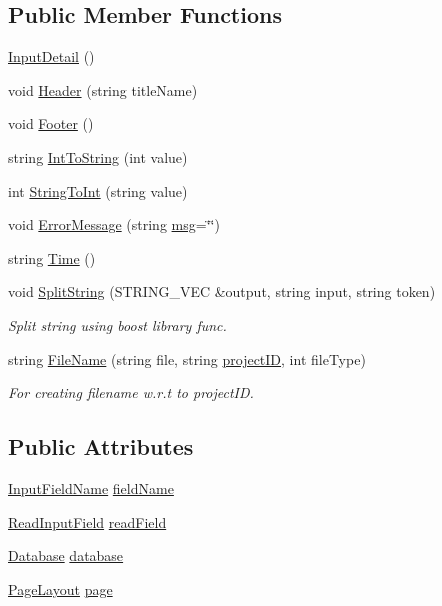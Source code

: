 \subsection*{Public Member Functions}
\begin{DoxyCompactItemize}
\item 
\hyperlink{classInputDetail_ab53655b14d922eb32b5d5d06c702e497}{Input\-Detail} ()
\item 
void \hyperlink{classInputDetail_ae55dcc0e15b85d302a09046b145330bb}{Header} (string title\-Name)
\item 
void \hyperlink{classInputDetail_acbc05b1bc6a371cf0a52222cc95e467d}{Footer} ()
\item 
string \hyperlink{classInputDetail_ad0a78d7c864bcccf7813a526d59573be}{Int\-To\-String} (int value)
\item 
int \hyperlink{classInputDetail_aaf532dd61f0aee82b116fef2da8e821f}{String\-To\-Int} (string value)
\item 
void \hyperlink{classInputDetail_a7f1d6cf5e946dadd511c2437b796e5f7}{Error\-Message} (string \hyperlink{classInputDetail_a1abb16cd695678c3fa05e3c812823fee}{msg}=\char`\"{}\char`\"{})
\item 
string \hyperlink{classInputDetail_aaf6caee10a13697ca6dc2bc9aa02e8ab}{Time} ()
\item 
void \hyperlink{classInputDetail_aba635a55313b14cf8bb285560a55498e}{Split\-String} (S\-T\-R\-I\-N\-G\-\_\-\-V\-E\-C \&output, string input, string token)
\begin{DoxyCompactList}\small\item\em Split string using boost library func. \end{DoxyCompactList}\item 
string \hyperlink{classInputDetail_a509ee6dd2de52e87cb764d0b0cceb05a}{File\-Name} (string file, string \hyperlink{classInputDetail_a08069ee622c626c038b821ddcc7427b4}{project\-I\-D}, int file\-Type)
\begin{DoxyCompactList}\small\item\em For creating filename w.\-r.\-t to project\-I\-D. \end{DoxyCompactList}\end{DoxyCompactItemize}
\subsection*{Public Attributes}
\begin{DoxyCompactItemize}
\item 
\hyperlink{classInputFieldName}{Input\-Field\-Name} \hyperlink{classInputDetail_ac6f85380c5152c406d483726382c4798}{field\-Name}
\item 
\hyperlink{classReadInputField}{Read\-Input\-Field} \hyperlink{classInputDetail_ac0cc70b017ef94fb55acb46fc44f0df5}{read\-Field}
\item 
\hyperlink{classDatabase}{Database} \hyperlink{classInputDetail_a479cd6c13833bd5de6e5630078c961b6}{database}
\item 
\hyperlink{classPageLayout}{Page\-Layout} \hyperlink{classInputDetail_ae487757aaafba4ac372c327e2b7a9673}{page}
\end{DoxyCompactItemize}
